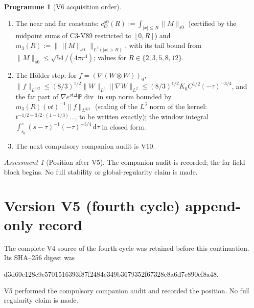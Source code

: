 \documentclass[11pt]{article}
\newcommand{\dd}{\,\mathrm d}
\newcommand{\PP}{\mathbb P}
\theoremstyle{plain}
\theoremstyle{definition}
\newtheorem{programme}[theorem]{Programme}
\theoremstyle{remark}
\newtheorem{assessment}[theorem]{Assessment}
\begin{document}
\begin{programme}[V6 acquisition order]
\label{prog:c4v6}
\begin{enumerate}[label=\textup{(AC\arabic*)},leftmargin=4.8em]
\item The near and far constants: \(c_O^{s0}(R):=\int_{|x|\le R}\|M\|_{s0}\) (certified by the
      midpoint sums of C3-V89 restricted to \([0,R]\)) and
      \(m_3(R):=\|\,\|M\|_{s0}\,\|_{L^3(|x|>R)}\), with its tail bound from
      \(\|M\|_{s0}\le\sqrt{54}/(4\pi r^4)\); values for \(R\in\{2,3,5,8,12\}\).
\item The H\"older step: for \(f=(\nabla(W\otimes W))_0\),
      \(\|f\|_{L^{3/2}}\le(8/3)^{1/2}\|W\|_{L^6}\|\nabla W\|_{L^2}\le(8/3)^{1/2}K_6C^{1/2}(-\tau)^{-3/4}\), and the far part of
      \(\nabla e^{\nu t\Delta}\PP\operatorname{div}\) in sup norm bounded by \(m_3(R)(\nu t)^{-1}\|f\|_{L^{3/2}}\) (scaling of
      the \(L^3\) norm of the kernel: \(t^{-1/2-3/2\cdot(1-1/3)}\dots\), to be written
      exactly); the window integral \(\int_{s_0}^s(s-\tau)^{-1}(-\tau)^{-3/4}\dd\tau\) in closed
      form.
\item The next compulsory companion audit is V10.
\end{enumerate}
\end{programme}

\begin{assessment}[Position after V5]
\label{ass:c4v5-position}
The companion audit is recorded; the far-field block begins.  No
full stability or global-regularity claim is made.
\end{assessment}

\section*{Version V5 (fourth cycle) append-only record}

The complete V4 source of the fourth cycle was retained before this
continuation.  Its SHA--256 digest was
\begin{center}\scriptsize\ttfamily
d3d60e128c9e5701516393f87f2484e349b3679352f67328e8a6d7c890ef8a48.
\end{center}
V5 performed the compulsory companion audit and recorded the
position.  No full regularity claim is made.
\end{document}
